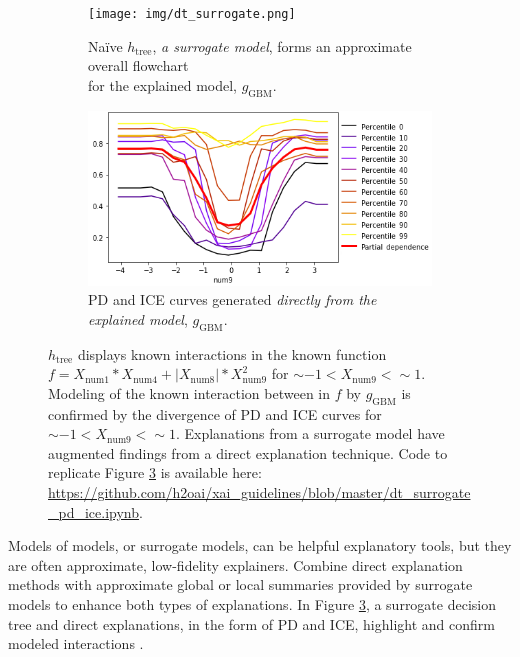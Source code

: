 \documentclass[sigconf]{acmart}
\begin{document}
\begin{figure}[htb!]
	\begin{subfigure}{.55\textwidth}	\centering
		\texttt{[image: img/dt\_surrogate.png]}
  		\caption{Na\"ive $h_{\text{tree}}$, \textit{a surrogate model}, forms an approximate overall flowchart\\ for the explained model, $g_{\text{GBM}}$.}
  		\label{fig:dt_surrogate}
	\end{subfigure}\hfill
	\begin{subfigure}{.45\textwidth}	\centering
  		\includegraphics[height=0.4\linewidth, width=0.75\linewidth]{img/pdp_ice.png}
  		\caption{PD and ICE curves generated \textit{directly from the explained model}, $g_{\text{GBM}}$.}
  		\label{fig:pdp_ice}
	\end{subfigure} \vspace{-5pt}
	\caption{$h_{\text{tree}}$ displays known interactions in the known function $f = X_{\text{num}1} * X_{\text{num}4} + |X_{\text{num}8}| * X_{\text{num}9}^2$ for $\sim -1 < X_{\text{num9}} <  \sim 1$. Modeling of the known interaction between in $f$ by $g_{\text{GBM}}$ is confirmed by the divergence of PD and ICE curves for $\sim -1 < X_{\text{num9}} <  \sim 1$. Explanations from a surrogate model have augmented findings from a direct explanation technique. Code to replicate Figure \ref{fig:pdp_ice_dt_surrogate} is available here: \url{https://github.com/h2oai/xai_guidelines/blob/master/dt_surrogate_pd_ice.ipynb}.}
	\label{fig:pdp_ice_dt_surrogate}
\end{figure}

Models of models, or surrogate models, can be helpful explanatory tools, but they are often approximate, low-fidelity explainers. Combine direct explanation methods with approximate global or local summaries provided by surrogate models to enhance both types of explanations. In Figure \ref{fig:pdp_ice_dt_surrogate}, a surrogate decision tree and direct explanations, in the form of PD and ICE, highlight and confirm modeled interactions \cite{art_and_sci}.
\end{document}
